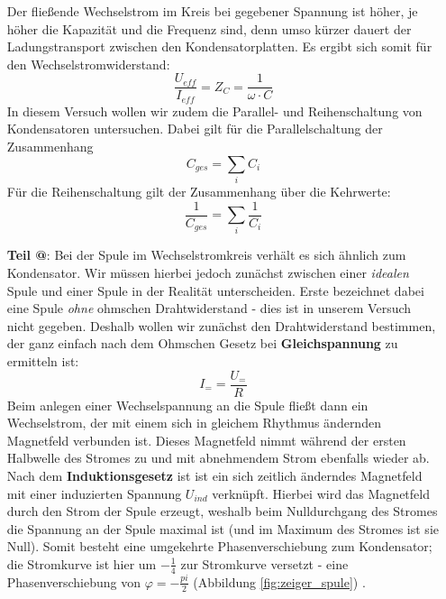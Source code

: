 \documentclass[10pt,a4paper]{article}
\makeatletter
\newcommand*{\rom}[1]{\expandafter\@slowromancap\romannumeral #1@}
\makeatother
\begin{document}
\begin{flushleft}
\begin{itemize}
Der fließende Wechselstrom im Kreis bei gegebener Spannung ist höher, je höher die Kapazität und die Frequenz sind, denn umso kürzer dauert der Ladungstransport zwischen den Kondensatorplatten. Es ergibt sich somit für den Wechselstromwiderstand:
\begin{equation}\label{eq:kond}
\frac{U_{eff}}{I_{eff}} = Z_C = \frac{1}{\omega \cdot C}
\end{equation}
In diesem Versuch wollen wir zudem die Parallel- und Reihenschaltung von Kondensatoren untersuchen. Dabei gilt für die Parallelschaltung der Zusammenhang
\begin{equation}\label{eq:kond_para}
C_{ges} = \sum_i C_i
\end{equation}
Für die Reihenschaltung gilt der Zusammenhang über die Kehrwerte:
\begin{equation}\label{eq:kond_reihe}
\frac{1}{C_{ges}} = \sum_i \frac{1}{C_i}
\end{equation}

\item[\textbf{Teil \rom{2}}:] Bei der Spule im Wechselstromkreis verhält es sich ähnlich zum Kondensator. Wir müssen hierbei jedoch zunächst zwischen einer \textit{idealen} Spule und einer Spule in der Realität unterscheiden. Erste bezeichnet dabei eine Spule \textit{ohne} ohmschen Drahtwiderstand - dies ist in unserem Versuch nicht gegeben. Deshalb wollen wir zunächst den Drahtwiderstand bestimmen, der ganz einfach nach dem Ohmschen Gesetz bei \textbf{Gleichspannung} zu ermitteln ist:
\begin{equation}\label{eq:spule_gleichspannung}
I_{=} = \frac{U_{=}}{R}
\end{equation}
Beim anlegen einer Wechselspannung an die Spule fließt dann ein Wechselstrom, der mit einem sich in gleichem Rhythmus ändernden Magnetfeld verbunden ist. Dieses Magnetfeld nimmt während der ersten Halbwelle des Stromes zu und mit abnehmendem Strom ebenfalls wieder ab. Nach dem \textbf{Induktionsgesetz} ist ist ein sich zeitlich änderndes Magnetfeld mit einer induzierten Spannung $U_{ind}$ verknüpft. Hierbei wird das Magnetfeld durch den Strom der Spule erzeugt, weshalb beim Nulldurchgang des Stromes die Spannung an der Spule maximal ist (und im Maximum des Stromes ist sie Null). Somit besteht eine umgekehrte Phasenverschiebung zum Kondensator; die Stromkurve ist hier um $- \frac{1}{4}$ zur Stromkurve versetzt - eine Phasenverschiebung von $\varphi = - \frac{pi}{2}$ (Abbildung \ref{fig:zeiger_spule}) \cite{vers9}.


\end{itemize}
\end{flushleft}
\end{document}
